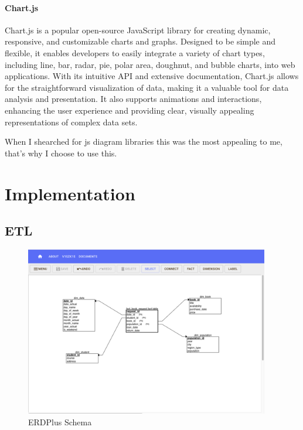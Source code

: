 \documentclass[12pt]{report}
\begin{document}
\subsubsection{Chart.js}
Chart.js is a popular open-source JavaScript library for creating dynamic, responsive, and customizable charts and graphs. Designed to be simple and flexible, it enables developers to easily integrate a variety of chart types, including line, bar, radar, pie, polar area, doughnut, and bubble charts, into web applications. With its intuitive API and extensive documentation, Chart.js allows for the straightforward visualization of data, making it a valuable tool for data analysis and presentation. It also supports animations and interactions, enhancing the user experience and providing clear, visually appealing representations of complex data sets. 

When I shearched for js diagram libraries this was the most appealing to me, that's why I choose to use this.


\chapter{Implementation} %

\section{ETL}

\begin{figure}[!ht]  
    \begin{center}
        \includegraphics[width=0.95\textwidth]{figures/erd_schema.png}
    \end{center}
    \caption{ERDPlus Schema}\label{fig:schema}
\end{figure}
\end{document}
